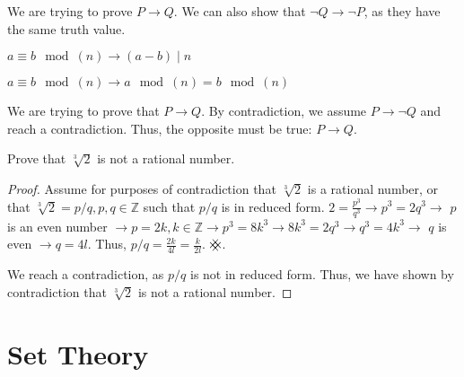 \documentclass[11pt]{scrartcl}
\theoremstyle{dotlessP}
\theoremstyle{dotlessN}
\newcommand{\ints}{\mathbb{Z}}
\newcommand{\contradiction}{{\hbox{%
    \setbox0=\hbox{$\mkern-3mu\times\mkern-3mu$}%
    \setbox1=\hbox to0pt{\hss$\times$\hss}%
    \copy0\raisebox{0.5\wd0}{\copy1}\raisebox{-0.5\wd0}{\box1}\box0
}}}
\begin{document}
\begin{definition}
	We are trying to prove $P \to Q$. We can also show that $\neg Q \to \neg P$, as they have the same truth value.
\end{definition}
\begin{definition}
	$a \equiv b \mod (n) \to (a - b) \mid n$ 
\end{definition}
\begin{theorem}
	$a \equiv b \mod (n) \to a \mod (n) = b \mod (n)$
\end{theorem}
\begin{example}
\end{example}
\begin{definition}
	We are trying to prove that $P \to Q$. By contradiction, we assume $P \to \neg Q$ and reach a contradiction. Thus, the opposite must be true: $P \to Q$. 
\end{definition}
\begin{example}
	Prove that $\sqrt[3] 2$ is not a rational number.
\end{example}
\begin{proof}
	Assume for purposes of contradiction that $\sqrt[3] 2$ is a rational number, or that $\sqrt[3] 2 = p/q, p,q \in \ints$ such that $p/q$ is in reduced form.
	$2 = \displaystyle\frac{p^3}{q^3} \to p^3 = 2q^3 \to$ $p$ is an even number $\to p = 2k, k \in \ints \to p^3 = 8k^3 \to 8k^3 = 2q^3 \to q^3 = 4k^3 \to$  $q$ is even $\to q = 4l$. Thus,  $p/q = \frac{2k}{4l} = \frac{k}{2l}$. $\contradiction$.

	We reach a contradiction, as $p/q$ is not in reduced form. Thus, we have shown by contradiction that $\sqrt[3] 2$ is not a rational number.
\end{proof}
\section{Set Theory}
\end{document}
